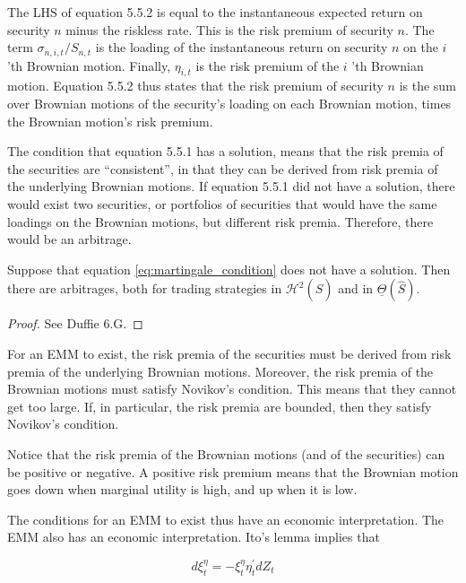 \documentclass[\topdir/lecture\_notes.tex]{subfiles}
\begin{document}
The LHS of equation 5.5.2 is equal to the instantaneous expected return on security \(n\) minus the riskless rate. This is the risk premium of security \(n\). The term \(\sigma_{n, i, t} / S_{n, t}\) is the loading of the instantaneous return on security \(n\) on the \(i\) 'th Brownian motion. Finally, \(\eta_{i, t}\) is the risk premium of the \(i\) 'th Brownian motion. Equation 5.5.2 thus states that the risk premium of security \(n\) is the sum over Brownian motions of the security's loading on each Brownian motion, times the Brownian motion's risk premium.

The condition that equation 5.5.1 has a solution, means that the risk premia of the securities are ``consistent'', in that they can be derived from risk premia of the underlying Brownian motions. If equation 5.5.1 did not have a solution, there would exist two securities, or portfolios of securities that would have the same loadings on the Brownian motions, but different risk premia. Therefore, there would be an arbitrage.

\begin{proposition}\label{prop:arbitrage_from_inconsistent_risk_premia}
Suppose that equation \eqref{eq:martingale_condition} does not have a solution. Then there are arbitrages, both for trading strategies in \(\mathcal{H}^{2}(\hat{S})\) and in \(\underline{\Theta}(\hat{S})\).
\end{proposition}

\begin{proof}
See Duffie 6.G.
\end{proof}

For an EMM to exist, the risk premia of the securities must be derived from risk premia of the underlying Brownian motions. Moreover, the risk premia of the Brownian motions must satisfy Novikov's condition. This means that they cannot get too large. If, in particular, the risk premia are bounded, then they satisfy Novikov's condition.

Notice that the risk premia of the Brownian motions (and of the securities) can be positive or negative. A positive risk premium means that the Brownian motion goes down when marginal utility is high, and up when it is low.

The conditions for an EMM to exist thus have an economic interpretation. The EMM also has an economic interpretation. Ito's lemma implies that

\begin{equation*}
d \xi_{t}^{\eta}=-\xi_{t}^{\eta} \eta_{t}^{\prime} d Z_{t}
\end{equation*}
\end{document}
